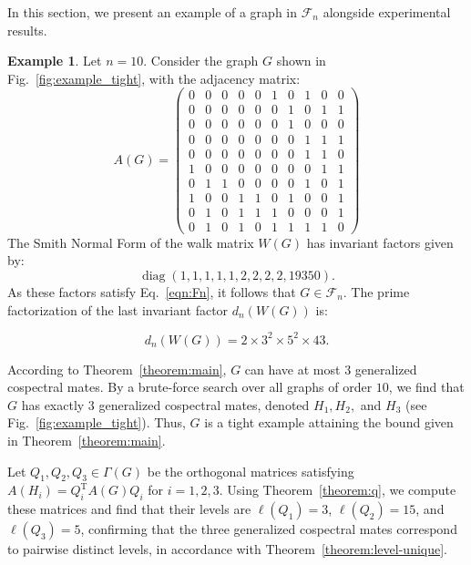 \documentclass[12pt]{article}
\theoremstyle{plain}
\theoremstyle{definition}
\newtheorem{example}{Example}[section]
\newcommand{\trans}{^{\mathrm{T}}}
\begin{document}
In this section, we present an example of a graph in $\mathcal{F}_n$ alongside experimental results.

\begin{example}
Let $n=10$. Consider the graph $G$ shown in Fig.~\ref{fig:example_tight}, with the adjacency matrix:
$$A(G)=
\begin{pmatrix}
0&0&0&0&0&1&0&1&0&0\\
0&0&0&0&0&0&1&0&1&1\\
0&0&0&0&0&0&1&0&0&0\\
0&0&0&0&0&0&0&1&1&1\\
0&0&0&0&0&0&0&1&1&0\\
1&0&0&0&0&0&0&0&1&1\\
0&1&1&0&0&0&0&1&0&1\\
1&0&0&1&1&0&1&0&0&1\\
0&1&0&1&1&1&0&0&0&1\\
0&1&0&1&0&1&1&1&1&0
\end{pmatrix}$$
The Smith Normal Form of the walk matrix $W(G)$ has invariant factors given by:
$$\operatorname{diag}(1, 1, 1, 1, 1, 2, 2, 2, 2, 19350)
.$$
As these factors satisfy Eq.~\eqref{eqn:Fn}, it follows that $G\in \mathcal{F}_n$. The prime factorization of the last invariant factor $d_n(W(G))$ is:

$$d_n(W(G)) = 2 \times 3^2 \times 5^2 \times 43.$$

According to Theorem~\ref{theorem:main}, $G$ can have at most $3$ generalized cospectral mates. By a brute-force search over all graphs of order $10$, we find that $G$ has exactly $3$ generalized cospectral mates, denoted $H_1, H_2,$ and $H_3$ (see Fig.~\ref{fig:example_tight}). Thus, $G$ is a tight example attaining the bound given in Theorem~\ref{theorem:main}.

Let $Q_1, Q_2, Q_3 \in \Gamma(G)$ be the orthogonal matrices satisfying $A(H_i) = Q_i\trans A(G) Q_i$ for $i=1,2,3$. Using Theorem~\ref{theorem:q}, we compute these matrices and find that their levels are $\ell(Q_1)=3$, $\ell(Q_2)=15$, and $\ell(Q_3)=5$, confirming that the three generalized cospectral mates correspond to pairwise distinct levels, in accordance with Theorem~\ref{theorem:level-unique}.
% 


\end{example}
\end{document}
